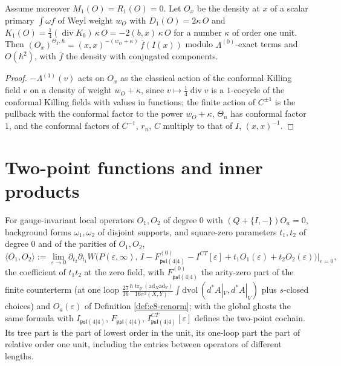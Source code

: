 \begin{proposition}
\label{prop:c8-primary}
Assume moreover $M_1(O)=R_1(O)=0$. Let $O_x$ be the density at $x$ of a scalar primary $\int\omega f$ of Weyl weight $w_O$ with $D_1(O)=2\kappa\,O$ and $K_1(O)=\tfrac14(\operatorname{div}K_b)\,\kappa\,O=-2(b,x)\,\kappa\,O$ for a number $\kappa$ of order one unit. Then $(O_x)^{\Theta_I,\hbar}=(x,x)^{-(w_O+\kappa)}\,\overline f(I(x))$ modulo $\Lambda^{(0)}$-exact terms and $O(\hbar^2)$, with $\overline f$ the density with conjugated components.
\end{proposition}

\begin{proof}
$-\Lambda^{(1)}(v)$ acts on $O_x$ as the classical action of the conformal Killing field $v$ on a density of weight $w_O+\kappa$, since $v\mapsto\tfrac14\operatorname{div}v$ is a $1$-cocycle of the conformal Killing fields with values in functions; the finite action of $C^{\pm1}$ is the pullback with the conformal factor to the power $w_O+\kappa$, $\Theta_n$ has conformal factor $1$, and the conformal factors of $C^{-1}$, $r_n$, $C$ multiply to that of $I$, $(x,x)^{-1}$.
\end{proof}

\section{Two-point functions and inner products}

\begin{definition}
\label{def:c8-2pt}
For gauge-invariant local operators $O_1,O_2$ of degree $0$ with $(Q+\{I,-\})O_a=0$, background forms $\omega_1,\omega_2$ of disjoint supports, and square-zero parameters $t_1,t_2$ of degree $0$ and of the parities of $O_1,O_2$,
\[
\big\langle O_1,O_2\big\rangle:=\lim_{\varepsilon\to0}\partial_{t_2}\partial_{t_1}W\big(P(\varepsilon,\infty),\,I-F^{(0)}_{\mathfrak{psl}(4|4)}-I^{CT}[\varepsilon]+t_1O_1(\varepsilon)+t_2O_2(\varepsilon)\big)\Big|_{e=0},
\]
the coefficient of $t_1t_2$ at the zero field, with $F^{(0)}_{\mathfrak{psl}(4|4)}$ the arity-zero part of the finite counterterm (at one loop $\tfrac{27}{16}\frac{\hbar\operatorname{tr}_{\mathfrak g}(\mathrm{ad}_X\mathrm{ad}_Y)}{16\pi^2(X,Y)}\int\mathrm{dvol}\,(d^*A|_V,d^*A|_V)$ plus $s$-closed choices) and $O_a(\varepsilon)$ of Definition \ref{def:c8-renorm}; with the global ghosts the same formula with $I_{\mathfrak{psl}(4|4)}$, $F_{\mathfrak{psl}(4|4)}$, $I^{CT}_{\mathfrak{psl}(4|4)}[\varepsilon]$ defines the two-point cochain. Its tree part is the part of lowest order in the unit, its one-loop part the part of relative order one unit, including the entries between operators of different lengths.
\end{definition}

